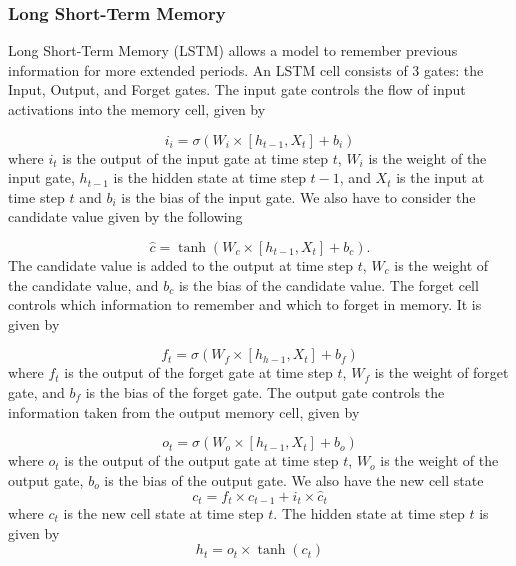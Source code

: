 \documentclass[12pt]{article}
\begin{document}
\subsubsection*{Long Short-Term Memory}

Long Short-Term Memory (LSTM) allows a model to remember previous information for more extended periods. An LSTM cell consists of 3 gates: the Input, Output, and Forget gates. The input gate controls the flow of input activations into the memory cell, given by 

\begin{equation}
	i_i=\sigma(W_i\times\left[h_{t-1}, X_t\right]+b_i)
\end{equation}
where $i_t$ is the output of the input gate at time step $t$, $W_i$ is the weight of the input gate, $h_{t-1}$ is the hidden state at time step $t-1$, and $X_t$ is the input at time step $t$ and $b_i$ is the bias of the input gate. We also have to consider the candidate value given by the following

\begin{equation}
	\hat{c}=\tanh(W_c\times\left[h_{t-1},X_t\right]+b_c).
\end{equation}
The candidate value is added to the output at time step $t$, $W_c$ is the weight of the candidate value, and $b_c$ is the bias of the candidate value. The forget cell controls which information to remember and which to forget in memory. It is given by

\begin{equation}
	f_t=\sigma(W_f\times\left[h_{h-1},X_t\right]+b_f)
\end{equation}
where $f_t$ is the output of the forget gate at time step $t$, $W_f$ is the weight of forget gate, and $b_f$ is the bias of the forget gate. The output gate controls the information taken from the output memory cell, given by

\begin{equation}
	o_t=\sigma(W_o\times\left[h_{t-1},X_t\right]+b_o)
\end{equation}
where $o_t$ is the output of the output gate at time step $t$, $W_o$ is the weight of the output gate, $b_o$ is the bias of the output gate. We also have the new cell state
\begin{equation}
	c_t=f_t\times c_{t-1}+i_t\times\hat{c}_t
\end{equation}
where $c_t$ is the new cell state at time step $t$. The hidden state at time step $t$ is given by
\begin{equation}
	h_t=o_t\times\tanh(c_t)
\end{equation}
\end{document}
